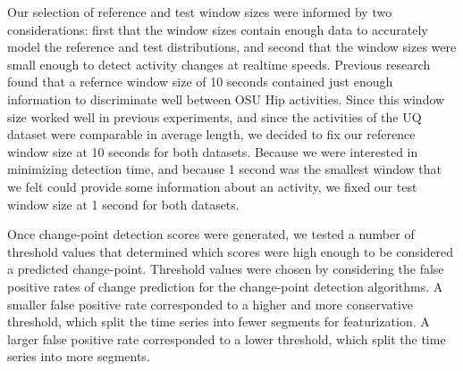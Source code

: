 Our selection of reference and test window sizes were informed by two considerations:
first that the window sizes contain enough data to accurately model the
reference and test distributions, and second that the window sizes were small enough
to detect activity changes at realtime speeds.
Previous research \cite{zheng12} found that a refernce window size of 10
seconds contained just enough information to discriminate well between OSU Hip activities.
Since this window size worked well in previous experiments, and since the 
activities of the UQ dataset were comparable in average length, we decided to
fix our reference window size at 10 seconds for both datasets. Because we were interested in
minimizing detection time, and because 1 second was the smallest window that
we felt could provide some information about an activity, we fixed our test
window size at 1 second for both datasets.

Once change-point detection scores were generated, we tested a number of threshold values that determined which
scores were high enough to be considered a predicted change-point.
Threshold values were chosen by considering the false positive rates of
change prediction for the change-point detection algorithms. A smaller false positive rate
corresponded to a higher and more conservative threshold, which split the
time series into fewer segments for featurization. A larger false positive rate
corresponded to a lower threshold, which split the time series into more segments.
